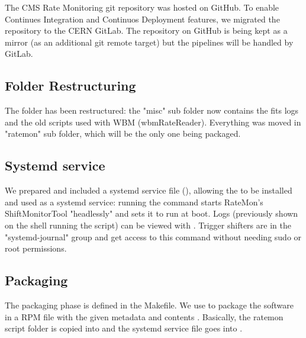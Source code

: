 The CMS Rate Monitoring git repository was hosted on GitHub. To enable Continues Integration and Continuos Deployment features, we migrated the repository to the CERN GitLab. The repository on GitHub is being kept as a mirror (as an additional git remote target) but the pipelines will be handled by GitLab.

\subsection{Folder Restructuring}

The folder has been restructured: the "misc" sub folder now contains the fits logs and the old scripts used with WBM (wbmRateReader). Everything was moved in "ratemon" sub folder, which will be the only one being packaged.

\subsection{Systemd service}

We prepared and included a systemd service file (), allowing the  to be installed and used as a systemd service: running the  command starts RateMon's ShiftMonitorTool "headlessly" and sets it to run at boot. Logs (previously shown on the shell running the script) can be viewed with . Trigger shifters are in the "systemd-journal" group and get access to this command without needing sudo or root permissions.


\subsection{Packaging}

The packaging phase is defined in the Makefile. We use  \cite{fpm-packager} to package the software in a RPM file with the given metadata and contents \cite{Packaging1MergeRequestsCMSTSGFOGratemonGitLab-2020-10-07}. Basically, the ratemon script folder is copied into  \cite{FilesystemHierarchyStandard-2015-05-20} and the systemd service file goes into .


